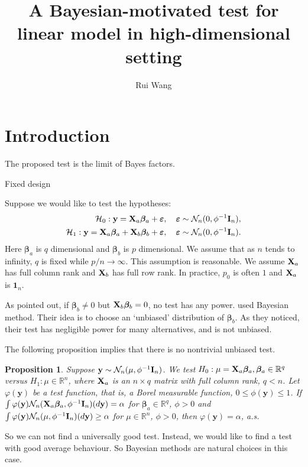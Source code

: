\documentclass[11pt]{article}
\title{
A Bayesian-motivated test for linear model in high-dimensional setting
}
\author[1]{Rui Wang}
\newcommand{\By}{\mathbf{y}}    \newcommand{\Bz}{\mathbf{z}}
\newcommand{\bfsym}[1]{\ensuremath{\boldsymbol{#1}}}
\def\bbeta{\bfsym \beta}
\theoremstyle{plain}
\newtheorem{proposition}{\quad\quad Proposition}
\theoremstyle{definition}
\theoremstyle{remark}
\begin{document}
\maketitle
\section{Introduction} 


The proposed test is the limit of Bayes factors.

Fixed design

Suppose we would like to test the hypotheses:
\begin{align*}
    \mathcal H_0:   \By = \BX_a \bbeta_a + \bepsilon,\quad \bepsilon\sim \mathcal N_n(0,\phi^{-1} \BI_n),
    \\
    \mathcal H_1:   \By = \BX_a \bbeta_a + \BX_b \bbeta_b + \bepsilon,\quad \bepsilon\sim \mathcal N_n(0,\phi^{-1} \BI_n).
\end{align*}
Here $\bbeta_a$ is $q$ dimensional and $\bbeta_b$ is $p$ dimensional.
We assume that as $n$ tends to infinity, $q$ is fixed while $p/n \to \infty$.
This assumption is reasonable.
We assume $\mathbf{X}_a$ has full column rank and $\mathbf{X}_b$ has full row rank.
In practice, $p_0$ is often $1$ and $\mathbf{X}_a$ is $\mathbf 1_n$.


As \cite{Goeman2006} pointed out, if $\bbeta_b \neq 0$ but $\BX_b \bbeta_b =0$, no test has any power.
\cite{Goeman2006} used Bayesian method.
Their idea is to choose an  `unbiased' distribution of $\bbeta_b$.
As they noticed, their test has negligible power for many alternatives, and is not unbiased.

The following proposition implies that there is no nontrivial unbiased test.
\begin{proposition}\label{prop:unbiased}
Suppose
$\By\sim \mathcal N_n (\mu, \phi^{-1}\BI_n)$.
We test $H_0: \mu=\BX_a \bbeta_a, \bbeta_a \in \mathbb R^q$ versus
$H_1: \mu\in \mathbb R^n$, where $\mathbf{X}_a$ is an $n\times q$ matrix with full column rank, $q<n$.
Let $\varphi(\By)$ be a test function, that is, a Borel measurable function, $0\leq \phi(\By)\leq 1$.
If $\int\varphi(\By) \mathcal N_n (\BX_a\bbeta_a, \phi^{-1} \BI_n) (d\By)=\alpha$ for $\bbeta_a \in \mathbb R^q$, $\phi>0$ and $\int\varphi(\By) \mathcal N_n (\mu, \phi^{-1} \BI_n) (d\By) \geq \alpha$ for $\mu\in \mathbb R^n$, $\phi>0$, then $\varphi(\By)=\alpha$, a.s.
\end{proposition}

So we can not find a universally good test.
Instead, we would like to find a test with good average behaviour.
So Bayesian methods are natural choices in this case.
\end{document}
